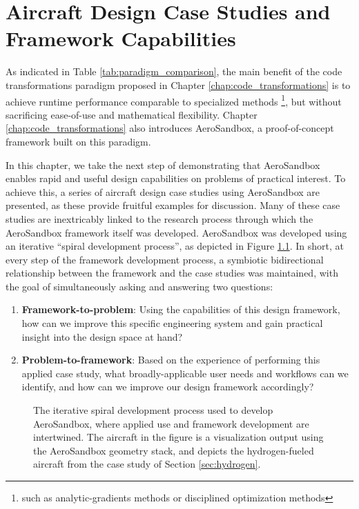 \chapter{Aircraft Design Case Studies and Framework Capabilities}
\label{chap:design-studies}

As indicated in Table \ref{tab:paradigm_comparison}, the main benefit of the code transformations paradigm proposed in Chapter \ref{chap:code_transformations} is to achieve runtime performance comparable to specialized methods \footnote{such as analytic-gradients methods or disciplined optimization methods}, but without sacrificing ease-of-use and mathematical flexibility. Chapter \ref{chap:code_transformations} also introduces AeroSandbox, a proof-of-concept framework built on this paradigm.

In this chapter, we take the next step of demonstrating that AeroSandbox enables rapid and useful design capabilities on problems of practical interest. To achieve this, a series of aircraft design case studies using AeroSandbox are presented, as these provide fruitful examples for discussion. Many of these case studies are inextricably linked to the research process through which the AeroSandbox framework itself was developed. AeroSandbox was developed using an iterative ``spiral development process'', as depicted in Figure \ref{fig:spiral}. In short, at every step of the framework development process, a symbiotic bidirectional relationship between the framework and the case studies was maintained, with the goal of simultaneously asking and answering two questions:

\begin{enumerate}[noitemsep]
    \item \textbf{Framework-to-problem}: Using the capabilities of this design framework, how can we improve this specific engineering system and gain practical insight into the design space at hand?
    \item \textbf{Problem-to-framework}: Based on the experience of performing this applied case study, what broadly-applicable user needs and workflows can we identify, and how can we improve our design framework accordingly?
\end{enumerate}

\begin{figure}[H]
    \centering
    
    \caption{The iterative spiral development process used to develop AeroSandbox, where applied use and framework development are intertwined. The aircraft in the figure is a visualization output using the AeroSandbox geometry stack, and depicts the hydrogen-fueled aircraft from the case study of Section \ref{sec:hydrogen}.}
    \label{fig:spiral}
\end{figure}


